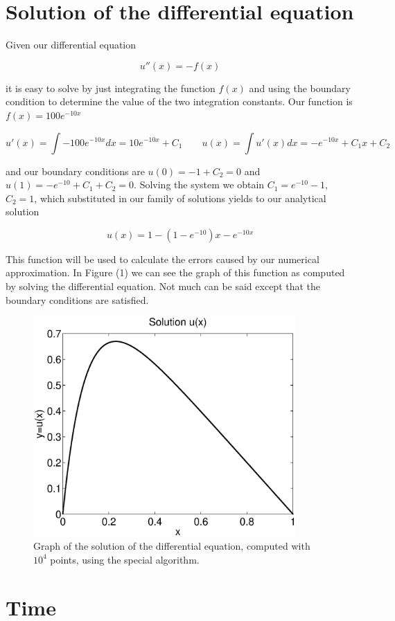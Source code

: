 \documentclass {article}
\begin{document}
\section{Solution of the differential equation}

Given our differential equation

$$u''(x)=-f(x)$$

it is easy to solve by just integrating the function $f(x)$ and using the boundary condition to determine the value of the two integration constants. Our function is $f(x)=100 e^{-10x}$

$$u'(x)=\int -100 e^{-10x} dx=10 e^{-10 x}+C_1 \quad \quad u(x)= \int u'(x) dx=-e^{-10x}+ C_1 x+ C_2$$

and our boundary conditions are $u(0)=-1+C_2=0$ and $u(1)=-e^{-10}+C_1+C_2=0$. Solving the system we obtain $C_1=e^{-10}-1$, $C_2=1$, which substituted in our family of solutions yields to our analytical solution

$$u(x)=1-(1-e^{-10})x-e^{-10 x}$$

This function will be used to calculate the errors caused by our numerical approximation. In Figure (1) we can see the graph of this function as computed by solving the differential equation. Not much can be said except that the boundary conditions are satisfied.

\begin{figure}[H]
	\centering
	\includegraphics[width=10cm]{solution}
	\caption{Graph of the solution of the differential equation, computed with $10^4$ points, using the special algorithm.}
	\label{fig:solution}
\end{figure} 

\section{Time}
\end{document}
